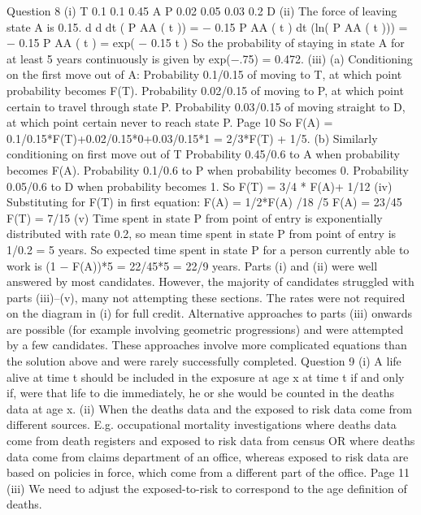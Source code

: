 \documentclass[a4paper,12pt]{article}
\begin{document}
\begin{enumerate}
Question 8
(i)
T
0.1
0.1
0.45
A
P
0.02
0.05
0.03
0.2
D
(ii)
The force of leaving state A is 0.15.
d
d
dt ( P AA ( t )) = − 0.15 P AA ( t )
dt (ln( P AA ( t ))) = − 0.15
P AA ( t ) = exp( − 0.15 t )
So the probability of staying in state A for at least 5 years continuously is given by
exp(−.75) = 0.472.
(iii)
(a)
Conditioning on the first move out of A:
Probability 0.1/0.15 of moving to T, at which point probability becomes F(T).
Probability 0.02/0.15 of moving to P, at which point certain to travel through
state P.
Probability 0.03/0.15 of moving straight to D, at which point certain never to
reach state P.
Page 10%
So F(A) = 0.1/0.15*F(T)+0.02/0.15*0+0.03/0.15*1 = 2/3*F(T) + 1/5.
(b)
Similarly conditioning on first move out of T
Probability 0.45/0.6 to A when probability becomes F(A).
Probability 0.1/0.6 to P when probability becomes 0.
Probability 0.05/0.6 to D when probability becomes 1.
So F(T) = 3/4 * F(A)+ 1/12
(iv)
Substituting for F(T) in first equation:
F(A) = 1/2*F(A) /18 /5
F(A) = 23/45
F(T) = 7/15
(v)
Time spent in state P from point of entry is exponentially distributed
with rate 0.2,
so mean time spent in state P from point of entry is 1/0.2 = 5 years.
So expected time spent in state P for a person currently
able to work is (1 − F(A))*5 = 22/45*5 = 22/9 years.
Parts (i) and (ii) were well answered by most candidates. However, the majority of
candidates struggled with parts (iii)–(v), many not attempting these sections. The rates were
not required on the diagram in (i) for full credit. Alternative approaches to parts (iii)
onwards are possible (for example involving geometric progressions) and were attempted by
a few candidates. These approaches involve more complicated equations than the solution
above and were rarely successfully completed.
Question 9
(i) A life alive at time t should be included in the exposure at age x at time t if and only
if, were that life to die immediately, he or she would be counted in the deaths data at
age x.
(ii) When the deaths data and the exposed to risk data come from different sources.
E.g. occupational mortality investigations where deaths data come from death
registers and exposed to risk data from census
OR
where deaths data come from claims department of an office, whereas exposed to risk
data are based on policies in force, which come from a different part of the office.
Page 11%
(iii)
We need to adjust the exposed-to-risk to correspond to the age definition of deaths.

\end{enumerate}
\end{document}
